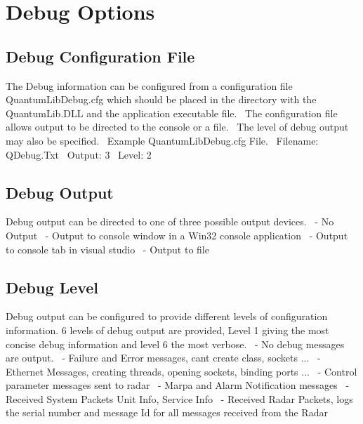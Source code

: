 \hypertarget{page5_Debug}{}\section{Debug Options}\label{page5_Debug}
\hypertarget{page5_File}{}\subsection{Debug Configuration File}\label{page5_File}
The Debug information can be configured from a configuration file Quantum\+Lib\+Debug.\+cfg which should be placed in the directory with the Quantum\+Lib.\+D\+LL and the application executable file.~\newline
The configuration file allows output to be directed to the console or a file.~\newline
The level of debug output may also be specified.~\newline
Example Quantum\+Lib\+Debug.\+cfg File.~\newline
Filename\+: Q\+Debug.\+Txt~\newline
Output\+: 3~\newline
Level\+: 2~\newline
\hypertarget{page5_Output}{}\subsection{Debug Output}\label{page5_Output}
Debug output can be directed to one of three possible output devices.~ -\/ No Output~ -\/ Output to console window in a Win32 console application~ -\/ Output to console tab in visual studio~ -\/ Output to file~\newline
\hypertarget{page5_Level}{}\subsection{Debug Level}\label{page5_Level}
Debug output can be configured to provide different levels of configuration information. 6 levels of debug output are provided, Level 1 giving the most concise debug information and level 6 the most verbose.~ -\/ No debug messages are output.~ -\/ Failure and Error messages, can\textquotesingle{}t create class, sockets ...~ -\/ Ethernet Messages, creating threads, opening sockets, binding ports ...~ -\/ Control parameter messages sent to radar~ -\/ Marpa and Alarm Notification messages~ -\/ Received System Packets Unit Info, Service Info~ -\/ Received Radar Packets, logs the serial number and message Id for all messages received from the Radar~\newline
 